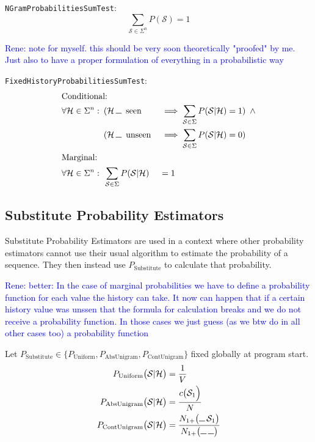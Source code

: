 \documentclass[11pt,a4paper]{article}
\newcommand{\Seq}{\mathcal{S}}
\newcommand{\Hist}{\mathcal{H}}
\newcommand{\Skp}{\rule{7pt}{.5pt}}
\newcommand{\rp}[1]{\textcolor{blue}{Rene: #1}}
\begin{document}
  \texttt{NGramProbabilitiesSumTest}:
  \begin{equation}
    \sum_{\Seq \in \Sigma^n} P(\Seq) = 1
  \end{equation}

  \rp{note for myself. this should be very soon theoretically "proofed" by me.
  Just also to have a proper formulation of everything in a probabilistic way}

  \texttt{FixedHistoryProbabilitiesSumTest}:
  \begin{alignat}{2}
    \intertext{Conditional:}
    \forall \Hist \in \Sigma^n:
    \enspace&(\Hist \, \Skp \enspace \mathrm{seen} &&\implies \sum_{\Seq \in \Sigma} P(\Seq | \Hist) = 1) \enspace \land \\
    \enspace&(\Hist \, \Skp \enspace \mathrm{unseen} &&\implies \sum_{\Seq \in \Sigma} P(\Seq | \Hist) = 0) \notag \\
    \intertext{Marginal:}
    \forall \Hist \in \Sigma^n:
    \enspace&\sum_{\Seq \in \Sigma} P(\Seq | \Hist) &&= 1
  \end{alignat}

  \subsection{Substitute Probability Estimators}

  Substitute Probability Estimators are used in a context where other
  probability estimators cannot use their usual algorithm to estimate the
  probability of a sequence. They then instead use $P_\mathrm{Substitute}$ to
  calculate that probability.

  \rp{better: In the case of marginal probabilities we have to define a
  probability function for each value the history can take. It now can happen
  that if a certain history value was unssen that the formula for calculation
  breaks and we do not receive a probability function. In those cases we just
  guess (as we btw do in all other cases too) a probability function}

  Let $P_\mathrm{Substitute} \in \big\{ P_\mathrm{Uniform} , P_\mathrm{AbsUnigram} , P_\mathrm{ContUnigram}\big\}$
  fixed globally at program start.
  \begin{align}
    P_\mathrm{Uniform}\big(\Seq | \Hist\big) &= \frac{1}{V} \\
    P_\mathrm{AbsUnigram}\big(\Seq | \Hist\big) &= \frac{c\big(\Seq_1\Big)}{N} \\
    P_\mathrm{ContUnigram}\big(\Seq | \Hist\big) &= \frac{N_{1+}\big(\Skp \, \Seq_1\big)}{N_{1+}\big(\Skp \, \Skp\big)}
  \end{align}
\end{document}
